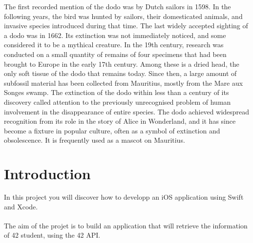 \documentclass{42}
\begin{document}
    The first recorded mention of the dodo was by Dutch sailors in 1598. In the following years, the bird was hunted by sailors, their domesticated animals, and invasive species introduced during that time. The last widely accepted sighting of a dodo was in 1662. Its extinction was not immediately noticed, and some considered it to be a mythical creature. In the 19th century, research was conducted on a small quantity of remains of four specimens that had been brought to Europe in the early 17th century. Among these is a dried head, the only soft tissue of the dodo that remains today. Since then, a large amount of subfossil material has been collected from Mauritius, mostly from the Mare aux Songes swamp. The extinction of the dodo within less than a century of its discovery called attention to the previously unrecognised problem of human involvement in the disappearance of entire species. The dodo achieved widespread recognition from its role in the story of Alice in Wonderland, and it has since become a fixture in popular culture, often as a symbol of extinction and obsolescence. It is frequently used as a mascot on Mauritius.\\


\newpage

    \chapter{Introduction}

    In this project you will discover how to developp an iOS application using Swift and Xcode.\\
    \\
    The aim of the projet is to build an application that will retrieve the information of 42 student, using the 42 API.\\

\end{document}
